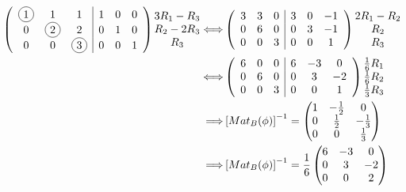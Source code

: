 \documentclass[notitlepage]{math}
\begin{document}
\begin{align*}
     \left( \begin{array}{ccc|ccc}
        \circled{1} & 1 & 1 & 1 & 0 & 0 \\
        0 & \circled{2} & 2 & 0 & 1 & 0 \\
        0 & 0 & \circled{3} & 0 & 0 & 1 \\
    \end{array}\right)  \begin{matrix}3R_1 - R_3 \\ R_2 - 2R_3 \\ R_3\end{matrix}
     \Longleftrightarrow &
    \left( \begin{array}{ccc|ccc}
        3 & 3 & 0 & 3 & 0 & -1 \\
        0 & 6 & 0 & 0 & 3 & -1 \\
        0 & 0 & 3 & 0 & 0 & 1 \\
    \end{array}\right) \begin{matrix} 2R_1-R_2 \\ R_2 \\ R_3 \end{matrix}  \\ 
    \Longleftrightarrow&
    \left( \begin{array}{ccc|ccc}
        6 & 0 & 0 & 6 & -3 & 0 \\
        0 & 6 & 0 & 0 & 3 & -2 \\
        0 & 0 & 3 & 0 & 0 & 1 \\
    \end{array}\right) \begin{matrix} \frac{1}{6}R_1 \\ \frac{1}{6}R_2 \\ \frac{1}{3}R_3 \end{matrix}  \\
    \Longrightarrow&  \left[ Mat_{B}(\phi) \right]^{-1} = \begin{pmatrix} 1 & -\frac{1}{2} & 0 \\ 0 & \frac{1}{2} & -\frac{1}{3} \\ 0 & 0 & \frac{1}{3} \end{pmatrix} \\
    \Longrightarrow& \left[ Mat_{B}(\phi) \right]^{-1} = \frac{1}{6} \begin{pmatrix} 6 & -3 & 0 \\ 0 & 3 & -2 \\ 0 & 0 & 2 \end{pmatrix} \\
\end{align*}
\end{document}
